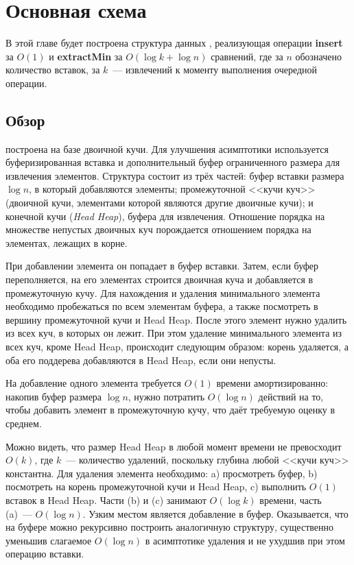 \chapter{Основная схема} \label{chapt-sch}

В этой главе будет построена структура данных \SCH, реализующая операции \textbf{insert}
за $O(1)$ и \textbf{extractMin} за $O(\log k + \log n)$ сравнений, где
за $n$ обозначено количество вставок, за $k$~--- извлечений к моменту выполнения
очередной операции.

\section{Обзор}
\SCH построена на базе двоичной кучи. Для улучшения
асимптотики используется буферизированная вставка и дополнительный буфер
ограниченного размера для извлечения элементов. Структура состоит из трёх
частей: буфер вставки размера $\log n$, в который добавляются элементы; промежуточной
<<кучи куч>> (двоичной кучи, элементами которой являются другие двоичные кучи);
и конечной кучи (\emph{Head Heap}), буфера для извлечения. Отношение порядка
на множестве непустых двоичных куч порождается отношением порядка на элементах,
лежащих в корне.

При добавлении элемента он попадает в буфер вставки. Затем, если буфер переполняется,
на его элементах строится двоичная куча и добавляется в промежуточную кучу.
Для нахождения и удаления минимального элемента необходимо пробежаться по всем
элементам буфера, а также посмотреть в вершину промежуточной кучи и Head Heap.
После этого элемент нужно удалить из всех куч, в которых он лежит. При этом
удаление минимального элемента из всех куч, кроме Head Heap, происходит следующим образом:
корень удаляется, а оба его поддерева добавляются в Head Heap, если они непусты.

На добавление одного элемента требуется $O(1)$ времени амортизированно: накопив
буфер размера $\log n$, нужно потратить $O(\log n)$ действий на то, чтобы добавить
элемент в промежуточную кучу, что даёт требуемую оценку в среднем.

Можно видеть, что размер Head Heap в любой момент времени не превосходит $O(k)$, где
$k$~--- количество удалений, поскольку глубина любой <<кучи куч>> константна.
Для удаления элемента необходимо: a) просмотреть буфер, b) посмотреть
на корень промежуточной кучи и Head Heap, c) выполнить $O(1)$ вставок в Head Heap.
Части (b) и (c) занимают $O(\log k)$ времени, часть (a)~--- $O(\log n)$.
Узким местом является добавление в буфер. Оказывается, что на буфере можно
рекурсивно построить аналогичную структуру, существенно уменьшив слагаемое
$O(\log n)$ в асимптотике удаления и не ухудшив при этом операцию вставки.

